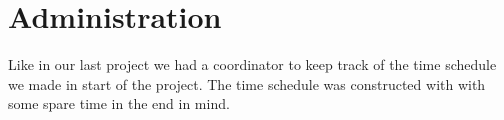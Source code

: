 \section{Administration}

Like in our last project we had a coordinator to keep track of the time schedule we made in start of the project. The time schedule was constructed with with some spare time in the end in mind.